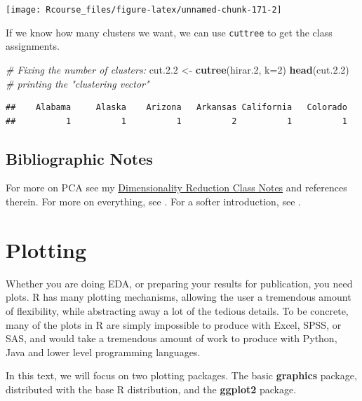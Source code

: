\documentclass[]{book}
\newenvironment{Shaded}{\begin{snugshade}}{\end{snugshade}}
\newcommand{\KeywordTok}[1]{\textcolor[rgb]{0.13,0.29,0.53}{\textbf{{#1}}}}
\newcommand{\DataTypeTok}[1]{\textcolor[rgb]{0.13,0.29,0.53}{{#1}}}
\newcommand{\DecValTok}[1]{\textcolor[rgb]{0.00,0.00,0.81}{{#1}}}
\newcommand{\FloatTok}[1]{\textcolor[rgb]{0.00,0.00,0.81}{{#1}}}
\newcommand{\StringTok}[1]{\textcolor[rgb]{0.31,0.60,0.02}{{#1}}}
\newcommand{\CommentTok}[1]{\textcolor[rgb]{0.56,0.35,0.01}{\textit{{#1}}}}
\newcommand{\NormalTok}[1]{{#1}}
\theoremstyle{definition}
\theoremstyle{definition}
\theoremstyle{remark}
\begin{document}
\texttt{[image: Rcourse\_files/figure-latex/unnamed-chunk-171-2]}

If we know how many clusters we want, we can use \texttt{cuttree} to get
the class assignments.

\begin{Shaded}
\begin{Highlighting}[]
\CommentTok{# Fixing the number of clusters:}
\NormalTok{cut}\FloatTok{.2.2} \NormalTok{<-}\StringTok{ }\KeywordTok{cutree}\NormalTok{(hirar}\FloatTok{.2}\NormalTok{, }\DataTypeTok{k=}\DecValTok{2}\NormalTok{)}
\KeywordTok{head}\NormalTok{(cut}\FloatTok{.2.2}\NormalTok{)   }\CommentTok{# printing the "clustering vector"}
\end{Highlighting}
\end{Shaded}

\begin{verbatim}
##    Alabama     Alaska    Arizona   Arkansas California   Colorado 
##          1          1          1          2          1          1
\end{verbatim}

\section{Bibliographic Notes}\label{bibliographic-notes-7}

For more on PCA see my
\href{https://github.com/johnros/dim_reduce/blob/master/dim_reduce.pdf}{Dimensionality
Reduction Class Notes} and references therein. For more on everything,
see \citet{friedman2001elements}. For a softer introduction, see
\citet{james2013introduction}.

\chapter{Plotting}\label{plotting}

Whether you are doing EDA, or preparing your results for publication,
you need plots. R has many plotting mechanisms, allowing the user a
tremendous amount of flexibility, while abstracting away a lot of the
tedious details. To be concrete, many of the plots in R are simply
impossible to produce with Excel, SPSS, or SAS, and would take a
tremendous amount of work to produce with Python, Java and lower level
programming languages.

In this text, we will focus on two plotting packages. The basic
\textbf{graphics} package, distributed with the base R distribution, and
the \textbf{ggplot2} package.
\end{document}
